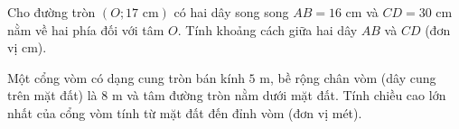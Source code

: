 \begin{bt}%
	Cho đường tròn $(O; 17\text{ cm})$ có hai dây song song $AB = 16\text{ cm}$ và $CD = 30\text{ cm}$ nằm về hai phía đối với tâm $O$. Tính khoảng cách giữa hai dây $AB$ và $CD$ (đơn vị cm).
\end{bt}

\begin{bt}%
	Một cổng vòm có dạng cung tròn bán kính $5\text{ m}$, bề rộng chân vòm (dây cung trên mặt đất) là $8\text{ m}$ và tâm đường tròn nằm dưới mặt đất. Tính chiều cao lớn nhất của cổng vòm tính từ mặt đất đến đỉnh vòm (đơn vị mét).
\end{bt}
